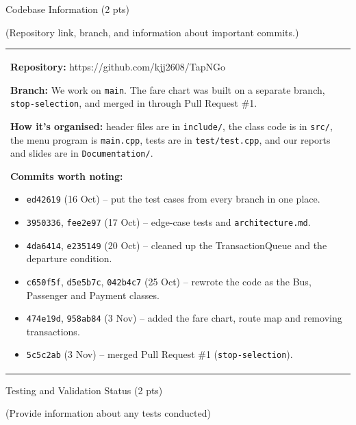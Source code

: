 \documentclass[12pt,a4paper]{article}
\newcommand{\sectiontitle}[1]{%
    {\color{GEUBlue}
    \fontsize{18}{22}\selectfont #1}
}
\newcommand{\instruction}[1]{%
    {\color{InstructionGrey}
    \fontsize{10.5}{13}\selectfont #1}
}
\newcommand{\answerbox}[2]{%
    \begin{tabularx}{\textwidth}{
        |>{\raggedright\arraybackslash}X|}
        \hline
        \parbox[t][#1][t]{\dimexpr\linewidth-12pt\relax}{
            \vspace{5pt}
            \fontsize{11}{13}\selectfont #2
        }\\
        \hline
    \end{tabularx}
}
\begin{document}
\vspace*{0.20cm}

\sectiontitle{Codebase Information (2 pts)}

\vspace{0.05cm}

\instruction{
(Repository link, branch, and information about important commits.)
}

\vspace{0.20cm}

\answerbox{7.2cm}{\textbf{Repository:} https://github.com/kjj2608/TapNGo

\textbf{Branch:} We work on \texttt{main}. The fare chart was built on a separate branch, \texttt{stop-selection}, and merged in through Pull Request \#1.

\textbf{How it's organised:} header files are in \texttt{include/}, the class code is in \texttt{src/}, the menu program is \texttt{main.cpp}, tests are in \texttt{test/test.cpp}, and our reports and slides are in \texttt{Documentation/}.

\textbf{Commits worth noting:}
\begin{itemize}\setlength{\itemsep}{0pt}\setlength{\parskip}{0pt}\setlength{\topsep}{2pt}
\item \texttt{ed42619} (16 Oct) -- put the test cases from every branch in one place.
\item \texttt{3950336}, \texttt{fee2e97} (17 Oct) -- edge-case tests and \texttt{architecture.md}.
\item \texttt{4da6414}, \texttt{e235149} (20 Oct) -- cleaned up the TransactionQueue and the departure condition.
\item \texttt{c650f5f}, \texttt{d5e5b7c}, \texttt{042b4c7} (25 Oct) -- rewrote the code as the Bus, Passenger and Payment classes.
\item \texttt{474e19d}, \texttt{958ab84} (3 Nov) -- added the fare chart, route map and removing transactions.
\item \texttt{5c5c2ab} (3 Nov) -- merged Pull Request \#1 (\texttt{stop-selection}).
\end{itemize}}

\newpage

\sectiontitle{Testing and Validation Status (2 pts)}

\vspace{0.05cm}

\instruction{(Provide information about any tests conducted)}

\vspace{0.30cm}
\end{document}
